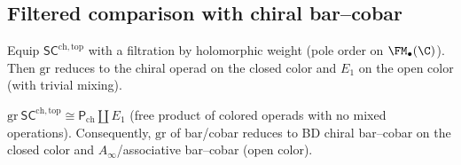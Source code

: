 \subsection{Filtered comparison with chiral bar--cobar}
\label{subsec:filtered-compare}
Equip $\mathsf{SC}^{\mathrm{ch,top}}$ with a filtration by holomorphic weight (pole order on $\FM_\bullet(\C)$). Then $\mathrm{gr}$ reduces to the chiral operad on the closed color and $E_1$ on the open color (with trivial mixing).

\begin{proposition}
\label{prop:gr-chiral}
$\mathrm{gr}\ \mathsf{SC}^{\mathrm{ch,top}} \cong \mathsf P_{\mathrm{ch}} \amalg E_1$ (free product of colored operads with no mixed operations). Consequently, $\mathrm{gr}$ of bar/cobar reduces to BD chiral bar--cobar on the closed color and $A_\infty$/associative bar--cobar (open color).
\end{proposition}

